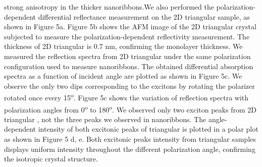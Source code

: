 \documentclass[journal=jacsnano,manuscript=article]{achemso}
\begin{document}
strong anisotropy in the thicker  nanoribbons.We also performed the polarization-dependent differential reflectance measurement on the 2D triangular  sample, as shown in Figure 5a. Figure 5b shows the AFM image of the 2D triangular  crystal subjected to measure the polarization-dependent reflectivity measurement. The thickness of 2D triangular  is 0.7 nm, confirming the monolayer thickness. We measured the reflection spectra from 2D triangular  under the same polarization configuration used to measure  nanoribbons. The obtained differential absorption spectra as a function of incident angle are plotted as shown in Figure 5c. We observe the only two dips corresponding to the excitons by rotating the polarizer rotated once every 15\textsuperscript{o}. Figure 5c shows the variation of reflection spectra with polarization angles from 0\textsuperscript{o} to 180\textsuperscript{o}. We observed only two exciton peaks from 2D triangular , not the three peaks we observed in  nanoribbons. The angle-dependent intensity of both excitonic peaks of triangular  is plotted in a polar plot as shown in Figure 5 d, e. Both excitonic peaks intensity from triangular  samples displays uniform intensity throughout the different polarization angle, confirming the isotropic crystal structure.
\end{document}
